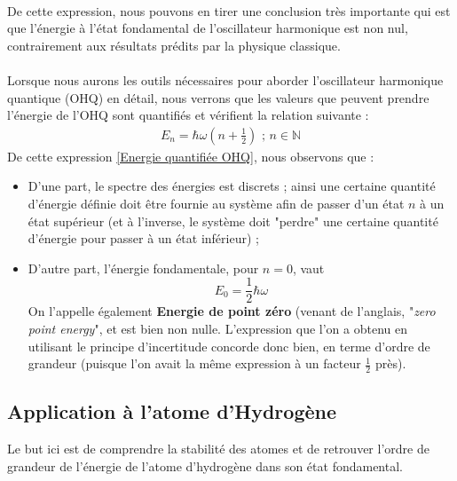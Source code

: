 \documentclass{book}
\begin{document}
\paragraph{} De cette expression, nous pouvons en tirer une conclusion très importante qui est que l'énergie à l'état fondamental de l'oscillateur harmonique est non nul, contrairement aux résultats prédits par la physique classique. 

\paragraph{} Lorsque nous aurons les outils nécessaires pour aborder l'oscillateur harmonique quantique (OHQ) en détail, nous verrons que les valeurs que peuvent prendre l'énergie de l'OHQ sont quantifiés et vérifient la relation suivante :
\begin{align}
\label{Energie quantifiée OHQ}
E_n = \hbar \omega \left( n + \frac{1}{2} \right) \mbox{ ; $n \in \mathbb{N} $}
\end{align}
De cette expression \eqref{Energie quantifiée OHQ}, nous observons que : 
\begin{itemize}%
    \item D'une part, le spectre des énergies est discrets ; ainsi une certaine quantité d'énergie définie doit être fournie au système afin de passer d'un état $n$ à un état supérieur (et à l'inverse, le système doit "perdre" une certaine quantité d'énergie pour passer à un état inférieur) ; \\
    \item D'autre part, l'énergie fondamentale, pour $n=0$, vaut $$ E_0 = \frac{1}{2} \hbar \omega $$
    On l'appelle également \textbf{Energie de point zéro} (venant de l'anglais, "\textit{zero point energy}", et est bien non nulle. 
    \newline L'expression que l'on a obtenu en utilisant le principe d'incertitude concorde donc bien, en terme d'ordre de grandeur (puisque l'on avait la même expression à un facteur $\frac{1}{2}$ près). 
\end{itemize} 


\subsection{Application à l'atome d'Hydrogène}
Le but ici est de comprendre la stabilité des atomes et de retrouver l'ordre de grandeur de l'énergie de l'atome d'hydrogène dans son état fondamental. \\
\end{document}
